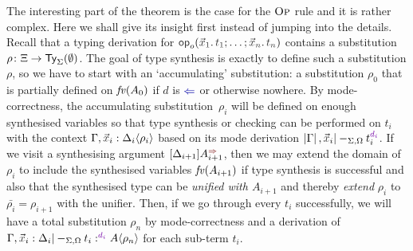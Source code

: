The interesting part of the theorem is the case for the $\textnormal{\textsc{Op}}$ rule and it is rather complex.
Here we shall give its insight first instead of jumping into the details.
Recall that a typing derivation for $\tmOpts$ contains a substitution $\rho\colon \Xi \to \mathsf{Ty}_{\Sigma}(\emptyset)$.
The goal of type synthesis is exactly to define such a substitution $\rho$, so we have to start with an `accumulating' substitution: a substitution $\rho_0$ that is partially defined on $\mathit{fv}(A_0)$ if $d$ is $\chk$ or otherwise nowhere.
By mode-correctness, the accumulating substitution~$\rho_i$ will be defined on enough synthesised variables so that type synthesis or checking can be performed on $t_{i}$ with the context $\Gamma, \vars{x}_{i} : \simsub{\Delta_{i}}{\rho_{i}}$ based on its mode derivation $\erase{\Gamma}, \vars{x}_i |-_{\Sigma, \Omega} t_i^{\dir{d_i}}$.
If we visit a synthesising argument $\synbiarg[i+1]$, then we may extend the domain of $\rho_i$ to include the synthesised variables $\mathit{fv}(A_{i + 1})$ if type synthesis is successful and also that the synthesised type can be \emph{unified with $A_{i+ 1}$} and thereby \emph{extend} $\rho_i$ to $\bar{\rho_i} = \rho_{i+1}$ with the unifier.
Then, if we go through every $t_i$ successfully, we will have a total substitution $\rho_n$ by mode-correctness and a derivation of $\Gamma, \vars{x}_i : \Delta_i |-_{\Sigma, \Omega} t_i :^{\dir{d_i}} \simsub{A}{\rho_n}$ for each sub-term $t_i$.

